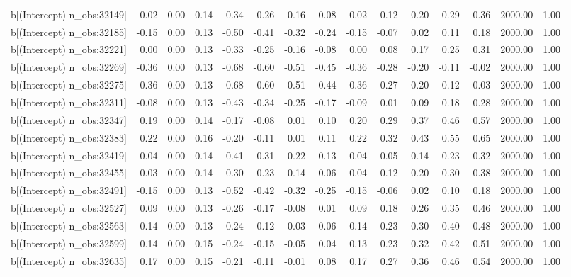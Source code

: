 \begin{table}[ht]
\begin{tabular}{rrrrrrrrrrrrrrr}
  b[(Intercept) n\_obs:32149] & 0.02 & 0.00 & 0.14 & -0.34 & -0.26 & -0.16 & -0.08 & 0.02 & 0.12 & 0.20 & 0.29 & 0.36 & 2000.00 & 1.00 \\ 
  b[(Intercept) n\_obs:32185] & -0.15 & 0.00 & 0.13 & -0.50 & -0.41 & -0.32 & -0.24 & -0.15 & -0.07 & 0.02 & 0.11 & 0.18 & 2000.00 & 1.00 \\ 
  b[(Intercept) n\_obs:32221] & 0.00 & 0.00 & 0.13 & -0.33 & -0.25 & -0.16 & -0.08 & 0.00 & 0.08 & 0.17 & 0.25 & 0.31 & 2000.00 & 1.00 \\ 
  b[(Intercept) n\_obs:32269] & -0.36 & 0.00 & 0.13 & -0.68 & -0.60 & -0.51 & -0.45 & -0.36 & -0.28 & -0.20 & -0.11 & -0.02 & 2000.00 & 1.00 \\ 
  b[(Intercept) n\_obs:32275] & -0.36 & 0.00 & 0.13 & -0.68 & -0.60 & -0.51 & -0.44 & -0.36 & -0.27 & -0.20 & -0.12 & -0.03 & 2000.00 & 1.00 \\ 
  b[(Intercept) n\_obs:32311] & -0.08 & 0.00 & 0.13 & -0.43 & -0.34 & -0.25 & -0.17 & -0.09 & 0.01 & 0.09 & 0.18 & 0.28 & 2000.00 & 1.00 \\ 
  b[(Intercept) n\_obs:32347] & 0.19 & 0.00 & 0.14 & -0.17 & -0.08 & 0.01 & 0.10 & 0.20 & 0.29 & 0.37 & 0.46 & 0.57 & 2000.00 & 1.00 \\ 
  b[(Intercept) n\_obs:32383] & 0.22 & 0.00 & 0.16 & -0.20 & -0.11 & 0.01 & 0.11 & 0.22 & 0.32 & 0.43 & 0.55 & 0.65 & 2000.00 & 1.00 \\ 
  b[(Intercept) n\_obs:32419] & -0.04 & 0.00 & 0.14 & -0.41 & -0.31 & -0.22 & -0.13 & -0.04 & 0.05 & 0.14 & 0.23 & 0.32 & 2000.00 & 1.00 \\ 
  b[(Intercept) n\_obs:32455] & 0.03 & 0.00 & 0.14 & -0.30 & -0.23 & -0.14 & -0.06 & 0.04 & 0.12 & 0.20 & 0.30 & 0.38 & 2000.00 & 1.00 \\ 
  b[(Intercept) n\_obs:32491] & -0.15 & 0.00 & 0.13 & -0.52 & -0.42 & -0.32 & -0.25 & -0.15 & -0.06 & 0.02 & 0.10 & 0.18 & 2000.00 & 1.00 \\ 
  b[(Intercept) n\_obs:32527] & 0.09 & 0.00 & 0.13 & -0.26 & -0.17 & -0.08 & 0.01 & 0.09 & 0.18 & 0.26 & 0.35 & 0.46 & 2000.00 & 1.00 \\ 
  b[(Intercept) n\_obs:32563] & 0.14 & 0.00 & 0.13 & -0.24 & -0.12 & -0.03 & 0.06 & 0.14 & 0.23 & 0.30 & 0.40 & 0.48 & 2000.00 & 1.00 \\ 
  b[(Intercept) n\_obs:32599] & 0.14 & 0.00 & 0.15 & -0.24 & -0.15 & -0.05 & 0.04 & 0.13 & 0.23 & 0.32 & 0.42 & 0.51 & 2000.00 & 1.00 \\ 
  b[(Intercept) n\_obs:32635] & 0.17 & 0.00 & 0.15 & -0.21 & -0.11 & -0.01 & 0.08 & 0.17 & 0.27 & 0.36 & 0.46 & 0.54 & 2000.00 & 1.00 \\ 

\end{tabular}
\end{table}
